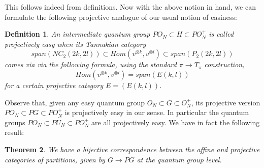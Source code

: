 \documentclass[12pt]{amsbook}
\newtheorem{theorem}{Theorem}[chapter]
\newtheorem{definition}[theorem]{Definition}
\begin{document}
This follows indeed from definitions. Now with the above notion in hand, we can formulate the following projective analogue of our usual notion of easiness:


\begin{definition}
An intermediate quantum group $PO_N\subset H\subset PO_N^+$ is called projectively easy when its Tannakian category
$$span(NC_2(2k,2l))\subset Hom(v^{\otimes k},v^{\otimes l})\subset span(P_2(2k,2l))$$
comes via via the following formula, using the standard $\pi\to T_\pi$ construction,
$$Hom(v^{\otimes k},v^{\otimes l})=span(E(k,l))$$
for a certain projective category $E=(E(k,l))$.
\end{definition}

Observe that, given any easy quantum group $O_N\subset G\subset O_N^+$, its projective version $PO_N\subset PG\subset PO_N^+$ is projectively easy in our sense. In particular the quantum groups $PO_N\subset PU_N\subset PO_N^+$ are all projectively easy. We have in fact the following result:

\begin{theorem}
We have a bijective correspondence between the affine and projective categories of partitions, given by $G\to PG$ at the quantum group level.
\end{theorem}
\end{document}
